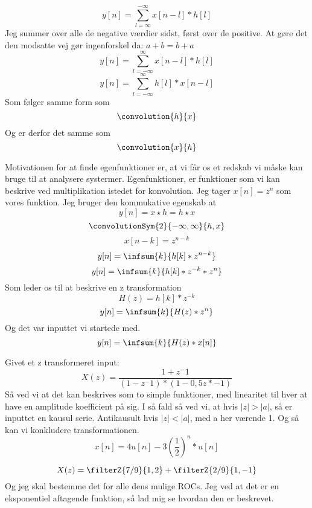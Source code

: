 \begin{Udledninger}
\begin{underrubrik}
        \[y[n] = \sum_{l = \infty}^{-\infty}{x[n - l]*h[l]}\]
        Jeg summer over alle de negative værdier sidst, først over de positive. 
        At gøre det den modsatte vej gør ingenforskel da: $a + b = b + a$
        \[y[n] = \sum_{l = -\infty}^{\infty}{x[n - l]*h[l]}\]
        \[y[n] = \sum_{l = -\infty}^{\infty}{h[l]*x[n - l]}\]
        Som følger samme form som
        \[\convolution{h}{x}\]
        Og er derfor det samme som
        \[\convolution{x}{h}\]
    \end{underrubrik}
    \begin{Udklip}
        \begin{underrubrik}
            Motivationen for at finde egenfunktioner er, at vi får os et redskab vi måske kan bruge til at analysere systermer.
            Egenfunktioner, er funktioner som vi kan beskrive ved multiplikation istedet for konvolution.
            Jeg tager $x[n] = z^n$ som vores funktion.
            Jeg bruger den kommukative egenskab at 
            \[y[n] = x\star h = h\star x\]
            \[\convolutionSym{2}{-\infty, \infty}{h, x}\]
            \[x[n-k] = z^{n-k}\]
            \[y[n] = \infsum{k}{h[k]*z^{n-k}}\]
            \[y[n] = \infsum{k}{h[k]*z^{-k}*z^n}\]
            Som leder os til at beskrive en z transformation
            \[H(z) = h[k]*z^{-k}\]
            \[y[n] = \infsum{k}{H(z)*z^n}\]
            Og det var inputtet vi startede med. 
            \[y[n] = \infsum{k}{H(z)*x[n]}\]
        \end{underrubrik}
    \end{Udklip}
    \begin{underrubrik}
        Givet et z transformeret input: 
        \[X(z) = \frac{1 + z^-1}{(1 - z^-1)*(1 - 0,5z*-1)}\]
        Så ved vi at det kan beskrives som to simple funktioner, med linearitet til hver at have en amplitude koefficient på sig. 
        I så fald så ved vi, at hvis $|z| > |a|$, så er inputtet en kausul serie. Antikausult hvis $|z| < |a|$, med a her værende 1. 
        Og så kan vi konkludere transformationen.
        \[x[n] = 4u[n] - 3(\frac{1}{2})^n*u[n]\]
    \end{underrubrik}
    \begin{underrubrik}
        \[X(z) = \filterZ{7/9}{1, 2} + \filterZ{2/9}{1, -1} \]
        Og jeg skal bestemme det for alle dens mulige ROCs. Jeg ved at det er en eksponentiel aftagende funktion, så lad mig se hvordan den er beskrevet.
        

\end{underrubrik}
\end{Udledninger}

